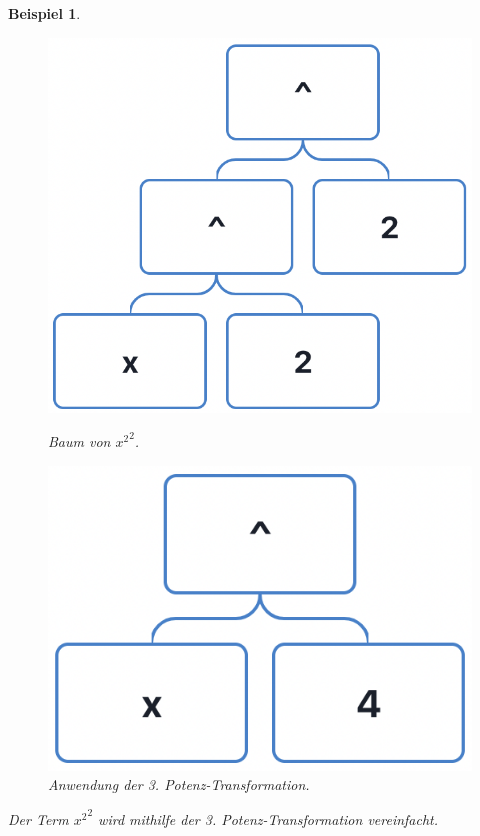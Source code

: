 \documentclass[11pt]{article}
\newtheorem{example}{Beispiel}
\begin{document}
\begin{example} \normalfont
  \begin{figure}[h!]
    \begin{minipage}{.5\textwidth}
      \centering
      \includegraphics[scale=0.4]{trees/power/beispiel_2_1.png}
      \caption{Baum von ${x^2}^2$.}
    \end{minipage}
    \begin{minipage}{.5\textwidth}
      \centering
      \includegraphics[scale=0.4]{trees/power/beispiel_2_2.png}
      \caption{Anwendung der 3. Potenz-Transformation.}
    \end{minipage}
  \end{figure}
  Der Term ${x^2}^2$ wird mithilfe der 3. Potenz-Transformation vereinfacht. 
\end{example}
\end{document}
